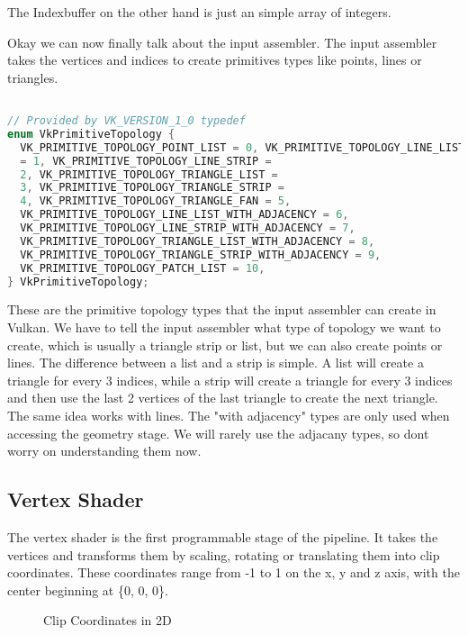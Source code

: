 \documentclass[12pt]{report} \usepackage{preamble}
\begin{document}
The Indexbuffer on the other hand is just an simple array of integers.
\cite{vulkan-tutorial-index-buffer}

Okay we can now finally talk about the input assembler. The input
assembler takes the vertices and indices to create primitives types like
points, lines or triangles. \cite{microsoft-ia}

\newpage

\begin{lstlisting}[language=C++] 

// Provided by VK_VERSION_1_0 typedef
enum VkPrimitiveTopology {
  VK_PRIMITIVE_TOPOLOGY_POINT_LIST = 0, VK_PRIMITIVE_TOPOLOGY_LINE_LIST
  = 1, VK_PRIMITIVE_TOPOLOGY_LINE_STRIP =
  2, VK_PRIMITIVE_TOPOLOGY_TRIANGLE_LIST =
  3, VK_PRIMITIVE_TOPOLOGY_TRIANGLE_STRIP =
  4, VK_PRIMITIVE_TOPOLOGY_TRIANGLE_FAN = 5,
  VK_PRIMITIVE_TOPOLOGY_LINE_LIST_WITH_ADJACENCY = 6,
  VK_PRIMITIVE_TOPOLOGY_LINE_STRIP_WITH_ADJACENCY = 7,
  VK_PRIMITIVE_TOPOLOGY_TRIANGLE_LIST_WITH_ADJACENCY = 8,
  VK_PRIMITIVE_TOPOLOGY_TRIANGLE_STRIP_WITH_ADJACENCY = 9,
  VK_PRIMITIVE_TOPOLOGY_PATCH_LIST = 10,
} VkPrimitiveTopology; 
\end{lstlisting} \cite{vulkan-spec-primitive-topology}

These are the primitive topology types that the input assembler can
create in Vulkan.  We have to tell the input assembler what type of
topology we want to create, which is usually a triangle strip or list,
but we can also create points or lines.  The difference between a list
and a strip is simple. A list will create a triangle for every 3 indices,
while a strip will create a triangle for every 3 indices and then use
the last 2 vertices of the last triangle to create the next triangle.
The same idea works with lines. The "with adjacency" types are only
used when accessing the geometry stage. We will rarely use
the adjacany types, so dont worry on understanding them now. \cite{vulkan-spec-primitive-topology}

\subsection{Vertex Shader}

The vertex shader is the first programmable stage of the pipeline. It takes
the vertices and transforms them by scaling, rotating or translating them
into clip coordinates.
These coordinates range from -1 to 1 on the x, y and z axis, with the center
beginning at \{0, 0, 0\}.

\begin{figure}[hbtp]
	\centering 
	\caption{Clip Coordinates in 2D}
\end{figure} \FloatBarrier
\end{document}
